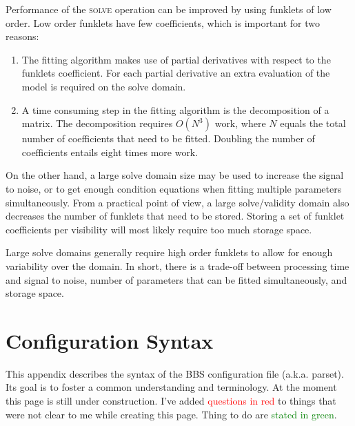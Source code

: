 \documentclass[10pt]{lofar}
\newcommand{\solve}{\textsc{solve}\xspace}
\begin{document}
Performance of the \solve operation can be improved by using funklets of low
order. Low order funklets have few coefficients, which is important for two
reasons:

\begin{enumerate}
\item The fitting algorithm makes use of partial derivatives with respect to the
funklets coefficient. For each partial derivative an extra evaluation of the
model is required on the solve domain.
\item A time consuming step in the fitting algorithm is the decomposition of a
matrix. The decomposition requires $O(N^3)$ work, where $N$ equals the total
number of coefficients that need to be fitted. Doubling the number of
coefficients entails eight times more work.
\end{enumerate}

On the other hand, a large solve domain size may be used to increase the signal
to noise, or to get enough condition equations when fitting multiple parameters
simultaneously. From a practical point of view, a large solve/validity domain
also decreases the number of funklets that need to be stored. Storing a set of
funklet coefficients per visibility will most likely require too much storage
space.

Large solve domains generally require high order funklets to allow for enough
variability over the domain. In short, there is a trade-off between processing
time and signal to noise, number of parameters that can be fitted
simultaneously, and storage space.

\cleardoublepage




\cleardoublepage

\appendix
\section{Configuration Syntax}
\label{sec:configuration-syntax}

This appendix describes the syntax of the BBS configuration file (a.k.a.
parset). Its goal is to foster a common understanding and terminology. At the
moment this page is still under construction. I've added
\textcolor{red}{questions in red} to things that were not clear to me while
creating this page. Thing to do are \textcolor{green}{stated in green}.
\end{document}
